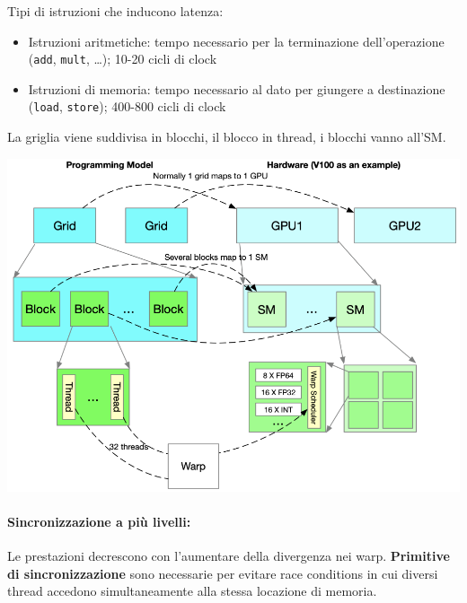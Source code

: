 Tipi di istruzioni che inducono latenza: 
\begin{itemize}
	\item Istruzioni aritmetiche: tempo necessario per la terminazione dell'operazione (\texttt{add}, \texttt{mult}, \dots); 10-20 cicli di clock
	
	\item Istruzioni di memoria: tempo necessario al dato per giungere a destinazione (\texttt{load}, \texttt{store}); 400-800 cicli di clock
\end{itemize}

La griglia viene suddivisa in blocchi, il blocco in thread, i blocchi vanno all'SM.
\begin{center}
	\includegraphics[width=0.8\linewidth]{img/cuda/modelandhwstruct}
\end{center}

\paragraph{Sincronizzazione a più livelli:} Le prestazioni decrescono con l'aumentare della divergenza nei warp. \textbf{Primitive di sincronizzazione} sono necessarie per evitare race conditions in cui diversi thread accedono simultaneamente alla stessa locazione di memoria. 

